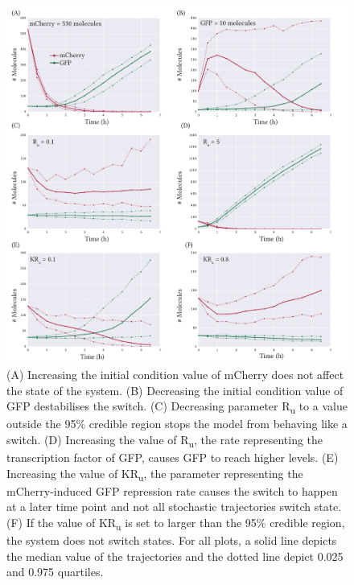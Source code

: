 \begin{figure}[htb]
\centerfloat
	\includegraphics[width=\textwidth]{../../chapters/chapterABCFlow/images/promoter_strengths.pdf}
	\caption[Changing the parameter values affects the behaviour of the switch ]{\label{fig:prom_str} (A) Increasing the initial condition value of mCherry does not affect the state of the system. (B) Decreasing the initial condition value of GFP destabilises the switch. (C) Decreasing parameter R\textsubscript{u} to a value outside the 95\% credible region stops the model from behaving like a switch. (D) Increasing the value of R\textsubscript{u}, the rate representing the transcription factor of GFP, causes GFP to reach higher levels. (E) Increasing  the value of KR\textsubscript{u}, the parameter representing the mCherry-induced GFP repression rate causes the switch to happen at a later time point and not all stochastic trajectories switch state. (F) If the value of KR\textsubscript{u} is set to larger than the 95\% credible region, the system does not switch states. For all plots, a solid line depicts the median value of the trajectories and the dotted line depict 0.025 and 0.975 quartiles.}
\end{figure}



\clearpage
